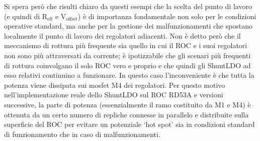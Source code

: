 Si spera per\`o che risulti chiaro da questi esempi che la scelta del punto di lavoro (e quindi di  $\mathrm{R_{eff}}$ e $\mathrm{V_{offset}}$) \`e di importanza fondamentale non solo per le condizioni operative standard, ma anche per la gestione dei malfunzionamenti che spostano localmente il punto di lavoro dei regolatori adiacenti. Non \`e detto per\`o che il meccanismo di rottura pi\`u frequente sia quello in cui il ROC e i suoi regolatori non sono pi\`u attraversati da corrente; \`e ipotizzabile che gli scenari pi\`u frequenti di rottura coinvolgano il solo ROC vero e proprio e che quindi gli ShuntLDO ad esso relativi continuino a funzionare. In questo caso l'inconveniente \`e che tutta la potenza viene dissipata sui mosfet M4 dei regolatori. Per questo motivo nell'implementazione reale dello ShuntLDO sul ROC RD53A e versioni successive, la parte di potenza (essenzialmente il ramo costituito da M1 e M4) \`e ottenuta da un certo numero di repliche connesse in parallelo e distribuite sulla superficie del ROC per evitare un potenziale `hot spot' sia in condizioni standard di funzionamento che in caso di malfunzionamenti.




